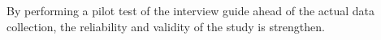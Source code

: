     By performing a pilot test of the interview guide ahead of the actual data collection, the reliability and validity of the study is strengthen.






